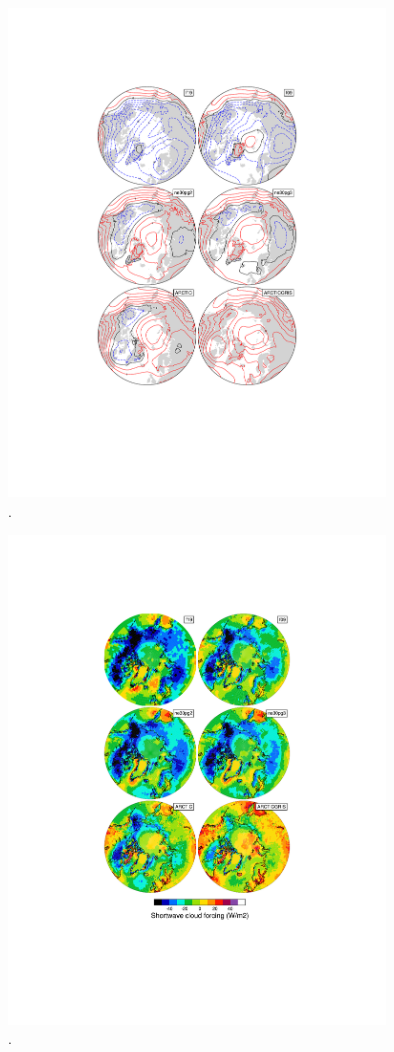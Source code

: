 \documentclass[draft]{agujournal2019}
\begin{document}
\begin{figure}[t]
\begin{center}
         \includegraphics[width=100mm]{figs/temp_contours_diffERA5_Thyps.pdf}
\end{center}
\caption{.}
\label{fig:dThyps}
\end{figure}

\begin{figure}[t]
\begin{center}
         \includegraphics[width=100mm]{figs/temp_contours_diffCERES_SWCF.pdf}
\end{center}
\caption{.}
\label{fig:SWCF}
\end{figure}
\end{document}
